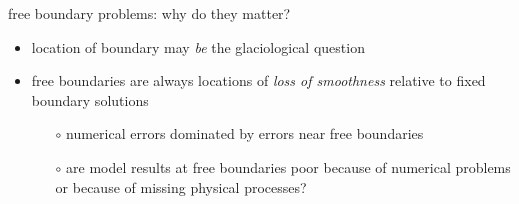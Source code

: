 \begin{frame}{free boundary problems: why do they matter?}
\begin{itemize}
\item location of boundary may \emph{be} the glaciological question
\item free boundaries are always locations of \emph{loss of smoothness} relative to fixed boundary solutions
     \begin{itemize}
     \item[$\circ$] numerical errors dominated by errors near free boundaries 
     \item[$\circ$] are model results at free boundaries poor because of numerical problems or because of missing physical processes?
     \end{itemize}
\end{itemize}
\end{frame}